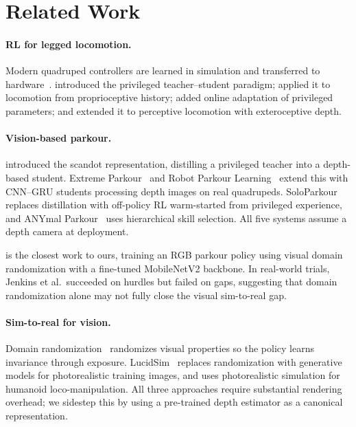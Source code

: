 \section{Related Work}
\label{sec:related}

\paragraph{RL for legged locomotion.}
Modern quadruped controllers are learned in simulation and
transferred to hardware~\citep{hwangbo2019learning, rudin2022learning}.
\citet{chen2020learning} introduced the privileged teacher--student
paradigm; \citet{lee2020learning} applied it to locomotion from
proprioceptive history; \citet{kumar2021rma} added online adaptation
of privileged parameters; and \citet{miki2022learning} extended it
to perceptive locomotion with exteroceptive depth.

\paragraph{Vision-based parkour.}
\citet{agarwal2023legged} introduced the scandot representation,
distilling a privileged teacher into a depth-based student.
Extreme Parkour~\citep{cheng2023parkour} and Robot Parkour
Learning~\citep{zhuang2023robot} extend this with CNN--GRU students
processing depth images on real quadrupeds.
SoloParkour~\citep{chane2025soloparkour} replaces distillation with
off-policy RL warm-started from privileged experience, and
ANYmal Parkour~\citep{hoeller2024anymal} uses hierarchical
skill selection.
All five systems assume a depth camera at deployment.

\citet{jenkins2024learning} is the closest work to ours,
training an RGB parkour policy using visual domain randomization with a
fine-tuned MobileNetV2 backbone. In real-world trials, Jenkins et al.\
succeeded on hurdles but failed on gaps, suggesting that domain
randomization alone may not fully close the visual sim-to-real gap.

\paragraph{Sim-to-real for vision.}
Domain randomization~\citep{tobin2017domain} randomizes visual
properties so the policy learns invariance through exposure.
LucidSim~\citep{yu2024lucidsim} replaces randomization with
generative models for photorealistic training images, and
\citet{xue2025opening} uses photorealistic simulation for humanoid
loco-manipulation.  All three approaches require substantial
rendering overhead; we sidestep this by using a pre-trained depth
estimator as a canonical representation.

